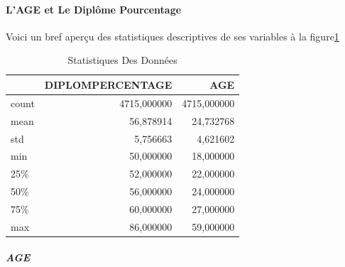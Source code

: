 \paragraph{L'AGE et Le Diplôme Pourcentage}
Voici un bref aperçu des statistiques descriptives de ses variables  à la figure\ref{tab:DescribeData}
\begin{table}
	\centering
	\begingroup %
	\captionsetup{type=table} %
	\caption{Statistiques Des Données }
	\label{tab:DescribeData}
	\begin{tabular}{lrr}
		\toprule
		{} &  DIPLOMPERCENTAGE &          AGE \\
		\midrule
		count &       4715,000000 &  4715,000000 \\
		mean  &         56,878914 &    24,732768 \\
		std   &          5,756663 &     4,621602 \\
		min   &         50,000000 &    18,000000 \\
		25\%   &         52,000000 &    22,000000 \\
		50\%   &         56,000000 &    24,000000 \\
		75\%   &         60,000000 &    27,000000 \\
		max   &         86,000000 &    59,000000 \\
		\bottomrule
	\end{tabular}
\endgroup
\end{table}
\subparagraph{AGE}

